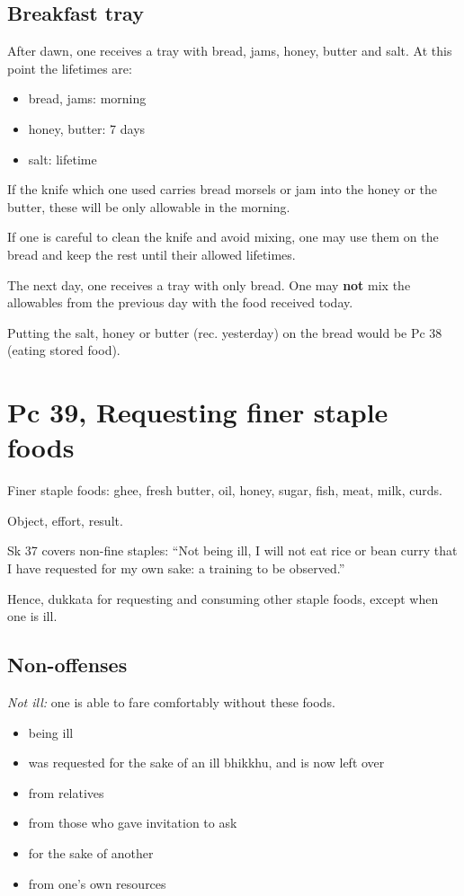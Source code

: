 \subsection{Breakfast tray}

After dawn, one receives a tray with bread, jams, honey, butter and
salt. At this point the lifetimes are:

\begin{itemize}
\tightlist
\item
  bread, jams: morning
\item
  honey, butter: 7 days
\item
  salt: lifetime
\end{itemize}

If the knife which one used carries bread morsels or jam into the honey
or the butter, these will be only allowable in the morning.

If one is careful to clean the knife and avoid mixing, one may use them
on the bread and keep the rest until their allowed lifetimes.

The next day, one receives a tray with only bread. One may \textbf{not}
mix the allowables from the previous day with the food received today.

Putting the salt, honey or butter (rec. yesterday) on the bread would be
Pc 38 (eating stored food).

\clearpage

\section{Pc 39, Requesting finer staple foods}

Finer staple foods: ghee, fresh butter, oil, honey, sugar, fish, meat,
milk, curds.

Object, effort, result.

Sk 37 covers non-fine staples: ``Not being ill, I will not eat rice or
bean curry that I have requested for my own sake: a training to be
observed.''

Hence, dukkata for requesting and consuming other staple foods, except
when one is ill.

\subsection{Non-offenses}

\emph{Not ill:} one is able to fare comfortably without these foods.

\begin{multicols}{2}

\begin{itemize}
\tightlist
\item
  being ill
\item
  was requested for the sake of an ill bhikkhu, and is now left over
\item
  from relatives
\item
  from those who gave invitation to ask
\item
  for the sake of another
\item
  from one's own resources
\end{itemize}

\end{multicols}

